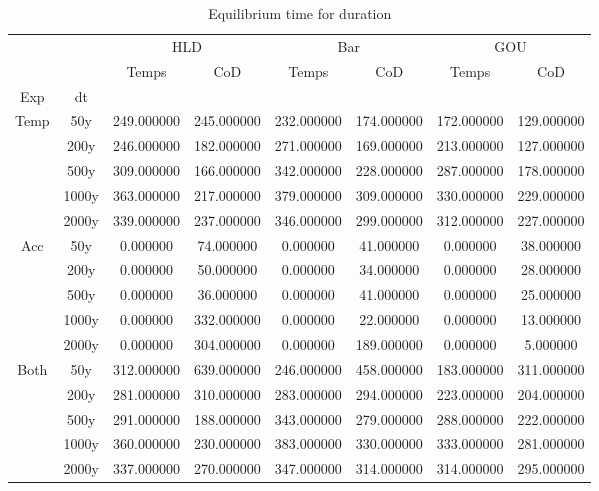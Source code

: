 \begin{table}[h]
\centering
\caption{Equilibrium time for duration}
\label{table:5}
\begin{tabular}{cccccccc}
\toprule
 &  & \multicolumn{2}{c}{HLD} & \multicolumn{2}{c}{Bar} & \multicolumn{2}{c}{GOU} \\
 &  & Temps & CoD & Temps & CoD & Temps & CoD \\
Exp & dt &  &  &  &  &  &  \\
\midrule
\multirow[c]{5}{*}{Temp} & 50y & 249.000000 & 245.000000 & 232.000000 & 174.000000 & 172.000000 & 129.000000 \\
 & 200y & 246.000000 & 182.000000 & 271.000000 & 169.000000 & 213.000000 & 127.000000 \\
 & 500y & 309.000000 & 166.000000 & 342.000000 & 228.000000 & 287.000000 & 178.000000 \\
 & 1000y & 363.000000 & 217.000000 & 379.000000 & 309.000000 & 330.000000 & 229.000000 \\
 & 2000y & 339.000000 & 237.000000 & 346.000000 & 299.000000 & 312.000000 & 227.000000 \\
\multirow[c]{5}{*}{Acc} & 50y & 0.000000 & 74.000000 & 0.000000 & 41.000000 & 0.000000 & 38.000000 \\
 & 200y & 0.000000 & 50.000000 & 0.000000 & 34.000000 & 0.000000 & 28.000000 \\
 & 500y & 0.000000 & 36.000000 & 0.000000 & 41.000000 & 0.000000 & 25.000000 \\
 & 1000y & 0.000000 & 332.000000 & 0.000000 & 22.000000 & 0.000000 & 13.000000 \\
 & 2000y & 0.000000 & 304.000000 & 0.000000 & 189.000000 & 0.000000 & 5.000000 \\
\multirow[c]{5}{*}{Both} & 50y & 312.000000 & 639.000000 & 246.000000 & 458.000000 & 183.000000 & 311.000000 \\
 & 200y & 281.000000 & 310.000000 & 283.000000 & 294.000000 & 223.000000 & 204.000000 \\
 & 500y & 291.000000 & 188.000000 & 343.000000 & 279.000000 & 288.000000 & 222.000000 \\
 & 1000y & 360.000000 & 230.000000 & 383.000000 & 330.000000 & 333.000000 & 281.000000 \\
 & 2000y & 337.000000 & 270.000000 & 347.000000 & 314.000000 & 314.000000 & 295.000000 \\
\bottomrule
\end{tabular}
\end{table}
